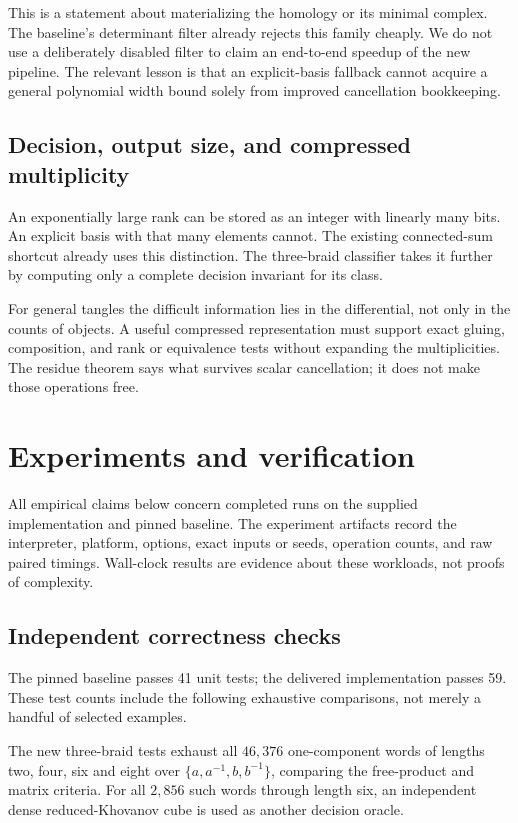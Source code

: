 \documentclass[11pt,letterpaper]{article}
\theoremstyle{definition}
\begin{document}
This is a statement about materializing the homology or its minimal
complex. The baseline's determinant filter already rejects this family
cheaply. We do not use a deliberately disabled filter to claim an
end-to-end speedup of the new pipeline. The relevant lesson is that an
explicit-basis fallback cannot acquire a general polynomial width bound
solely from improved cancellation bookkeeping.

\subsection{Decision, output size, and compressed multiplicity}

An exponentially large rank can be stored as an integer with linearly
many bits. An explicit basis with that many elements cannot.
The existing connected-sum shortcut already uses this distinction.
The three-braid classifier takes it further by computing only a
complete decision invariant for its class.

For general tangles the difficult information lies in the differential,
not only in the counts of objects. A useful compressed representation
must support exact gluing, composition, and rank or equivalence tests
without expanding the multiplicities. The residue theorem says what
survives scalar cancellation; it does not make those operations free.

\section{Experiments and verification}
\label{sec:experiments}

All empirical claims below concern completed runs on the supplied
implementation and pinned baseline. The experiment artifacts record
the interpreter, platform, options, exact inputs or seeds, operation
counts, and raw paired timings. Wall-clock results are evidence about
these workloads, not proofs of complexity.

\subsection{Independent correctness checks}

The pinned baseline passes 41 unit tests; the delivered implementation
passes 59. These test counts include the following exhaustive comparisons,
not merely a handful of selected examples.

The new three-braid tests exhaust all \(46{,}376\) one-component words
of lengths two, four, six and eight over
\(\{a,a^{-1},b,b^{-1}\}\), comparing the free-product and matrix criteria.
For all \(2{,}856\) such words through length six, an independent dense
reduced-Khovanov cube is used as another decision oracle.
\end{document}
